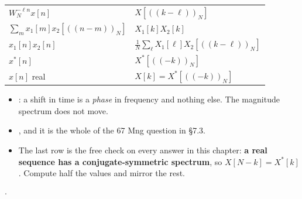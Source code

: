 {{\begin{tabular}{@{}L{3.3cm}L{3.5cm}@{}}
$W_N^{-\ell n}x[n]$ & $X[((k-\ell))_N]$ \\
$\sum_m x_1[m]x_2[((n-m))_N]$ & $X_1[k]X_2[k]$ \\
$x_1[n]x_2[n]$ & $\frac1N\sum_\ell X_1[\ell]X_2[((k-\ell))_N]$ \\
$x^*[n]$ & $X^*[((-k))_N]$ \\
$x[n]$ real & $X[k]=X^*[((-k))_N]$ \\
\bottomrule
\end{tabular}}
\begin{itemize}
  \item {}: a shift in time is a \emph{phase} in
        frequency and nothing else. The magnitude spectrum does not move.
  \item {}, and it is the whole of the 67 Mng question in \S7.3.
  \item The last row is the free check on every answer in this chapter:
        \textbf{a real sequence has a conjugate-symmetric spectrum}, so
        $X[N-k]=X^*[k]$. Compute half the values and mirror the rest.
\end{itemize}}

{\color{sub}\footnotesize {}  \gap$\cdot$\gap {}}


